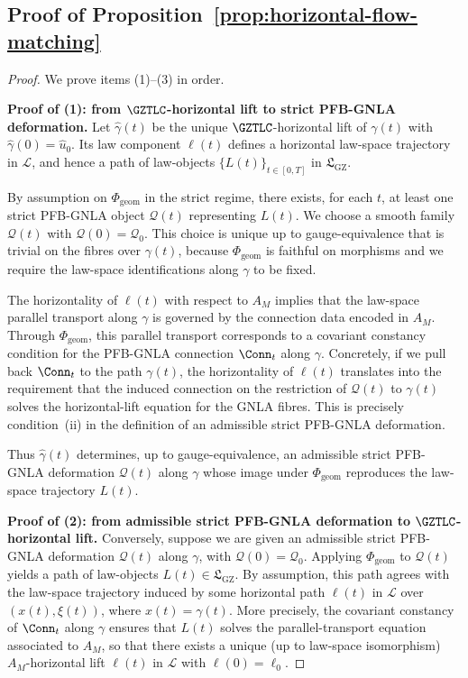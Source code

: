 \documentclass[11pt]{book}
\theoremstyle{plain}
\theoremstyle{definition}
\newcommand{\GZLS}{\ensuremath{\mathfrak{L}_{\mathrm{GZ}}}}       \newcommand{\GZLT}{\ensuremath{M_{!w}}}                           \newcommand{\GZLOC}{\ensuremath{A_M}}                             \newcommand{\GZLCurv}{\ensuremath{\mathcal{F}_{\mathrm{law}}}}
\begin{document}
\subsection*{Proof of Proposition~\ref{prop:horizontal-flow-matching}}


\begin{proof}
We prove items \textnormal{(1)}–\textnormal{(3)} in order.

\medskip\noindent
\textbf{Proof of (1): from \(\GZTLC\)-horizontal lift to strict
PFB-GNLA deformation.}
Let \(\widehat{\gamma}(t)\) be the unique \(\GZTLC\)-horizontal lift
of \(\gamma(t)\) with \(\widehat{\gamma}(0)=\widehat{u}_0\).  Its law
component \(\ell(t)\) defines a horizontal law-space trajectory in
\(\mathcal{L}\), and hence a path of law-objects \(\{L(t)\}_{t\in[0,T]}\)
in \(\GZLS\).

By assumption on \(\Phi_{\mathrm{geom}}\) in the strict regime, there
exists, for each \(t\), at least one strict PFB-GNLA object
\(\mathcal{Q}(t)\) representing \(L(t)\).  We choose a smooth family
\(\mathcal{Q}(t)\) with \(\mathcal{Q}(0)=\mathcal{Q}_0\).  This choice
is unique up to gauge-equivalence that is trivial on the fibres over
\(\gamma(t)\), because \(\Phi_{\mathrm{geom}}\) is faithful on morphisms
and we require the law-space identifications along \(\gamma\) to be
fixed.

The horizontality of \(\ell(t)\) with respect to \(\GZLOC\) implies
that the law-space parallel transport along \(\gamma\) is governed by
the connection data encoded in \(\GZLOC\).  Through
\(\Phi_{\mathrm{geom}}\), this parallel transport corresponds to a
covariant constancy condition for the PFB-GNLA connection
\(\Conn_t\) along \(\gamma\).  Concretely, if we pull back
\(\Conn_t\) to the path \(\gamma(t)\), the horizontality of
\(\ell(t)\) translates into the requirement that the induced
connection on the restriction of \(\mathcal{Q}(t)\) to \(\gamma(t)\)
solves the horizontal-lift equation for the GNLA fibres.  This
is precisely condition~(ii) in the definition of an admissible
strict PFB-GNLA deformation.

Thus \(\widehat{\gamma}(t)\) determines, up to gauge-equivalence, an
admissible strict PFB-GNLA deformation \(\mathcal{Q}(t)\) along
\(\gamma\) whose image under \(\Phi_{\mathrm{geom}}\) reproduces the
law-space trajectory \(L(t)\).



\medskip\noindent
\textbf{Proof of (2): from admissible strict PFB-GNLA deformation to
\(\GZTLC\)-horizontal lift.}
Conversely, suppose we are given an admissible strict PFB-GNLA
deformation \(\mathcal{Q}(t)\) along \(\gamma\), with
\(\mathcal{Q}(0)=\mathcal{Q}_0\).  Applying \(\Phi_{\mathrm{geom}}\) to
\(\mathcal{Q}(t)\) yields a path of law-objects \(L(t)\in\GZLS\).  By
assumption, this path agrees with the law-space trajectory induced by
some horizontal path \(\ell(t)\) in \(\mathcal{L}\) over
\((x(t),\xi(t))\), where \(x(t)=\gamma(t)\).  More precisely, the
covariant constancy of \(\Conn_t\) along \(\gamma\) ensures that
\(L(t)\) solves the parallel-transport equation associated to
\(\GZLOC\), so that there exists a unique (up to law-space isomorphism)
\(\GZLOC\)-horizontal lift \(\ell(t)\) in \(\mathcal{L}\) with
\(\ell(0)=\ell_0\).


\end{proof}
\end{document}
